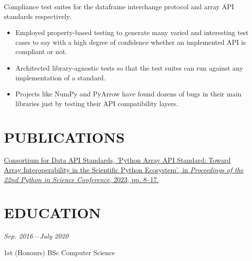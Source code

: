 \documentclass[11pt]{article}
\newcommand{\datedsubsection}[2]{{\large\subsectionfont{#1}} \hfill {\scriptsize\textit{#2}}}
\newcommand{\listhighlights}[1]{
	\begin{itemize}[topsep=2pt, partopsep=0pt, itemsep=2pt, parsep=0pt, leftmargin=12pt]
		#1
	\end{itemize}
}
\begin{document}
Compliance test suites for the dataframe interchange protocol and array API standards respectively.

\listhighlights{
	\item Employed property-based testing to generate many varied and interesting test cases to say with a high degree of confidence whether an implemented API is compliant or not.
	\item Architected library-agnostic tests so that the test suites can run against any implementation of a standard.
	\item Projects like NumPy and PyArrow have found dozens of bugs in their main libraries just by testing their API compatibility layers.
}

\section*{PUBLICATIONS}

\href{https://conference.scipy.org/proceedings/scipy2023/aaron_meurer.html}{Consortium for Data API Standards, 'Python Array API Standard: Toward Array Interoperability in the Scientific Python Ecosystem', in \textit{Proceedings of the 22nd Python in Science Conference}, 2023, pp. 8–17.}

\section*{EDUCATION}

\datedsubsection{Aston University}{Sep. 2016—July 2020}

1st (Honours) BSc Computer Science
\end{document}
